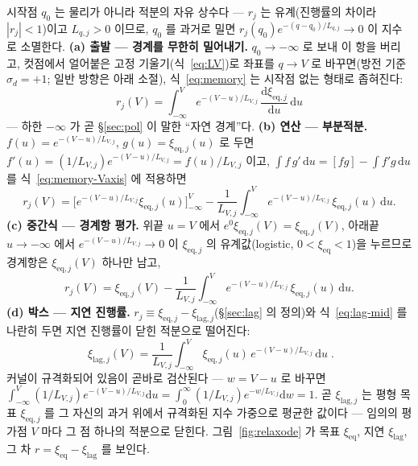 \documentclass[11pt,a4paper]{article}
\newcommand{\dd}{\mathrm{d}}
\newcommand{\eq}{\mathrm{eq}}
\begin{document}
시작점 $q_0$ 는 물리가 아니라 적분의 자유 상수다 --- $r_j$ 는 유계(진행률의 차이라 $|r_j|<1$)이고
$L_{q,j}>0$ 이므로, $q_0$ 를 과거로 밀면 $r_j(q_0)e^{-(q-q_0)/L_{q,j}}\to0$ 이 지수로 소멸한다.
\textbf{(a) 출발 --- 경계를 무한히 밀어내기.} $q_0\to-\infty$ 로 보내 이 항을 버리고, 컷점에서 얼어붙은
고정 기울기(식~\eqref{eq:LV})로 좌표를 $q\to V$ 로 바꾸면(방전 기준 $\sigma_d=+1$; 일반 방향은
아래 소절), 식~\eqref{eq:memory} 는 시작점 없는 형태로 좁혀진다:
\begin{equation}
r_j(V)=\int_{-\infty}^{V} e^{-(V-u)/L_{V,j}}\,\frac{\dd\xi_{\eq,j}}{\dd u}\,\dd u
\label{eq:memory-Vaxis}
\end{equation}
--- 하한 $-\infty$ 가 곧 \S\ref{sec:pol} 이 말한 ``자연 경계''다. \textbf{(b) 연산 --- 부분적분.}
$f(u)=e^{-(V-u)/L_{V,j}}$, $g(u)=\xi_{\eq,j}(u)$ 로 두면 $f'(u)=(1/L_{V,j})e^{-(V-u)/L_{V,j}}=f(u)/L_{V,j}$
이고, $\int f\,g'\,\dd u=[fg]-\int f'g\,\dd u$ 를 식~\eqref{eq:memory-Vaxis} 에 적용하면
\begin{equation}
r_j(V)=\Big[e^{-(V-u)/L_{V,j}}\xi_{\eq,j}(u)\Big]_{-\infty}^{V}
-\frac{1}{L_{V,j}}\int_{-\infty}^{V} e^{-(V-u)/L_{V,j}}\,\xi_{\eq,j}(u)\,\dd u.
\label{eq:lag-byparts}
\end{equation}
\textbf{(c) 중간식 --- 경계항 평가.} 위끝 $u=V$ 에서 $e^{0}\xi_{\eq,j}(V)=\xi_{\eq,j}(V)$, 아래끝
$u\to-\infty$ 에서 $e^{-(V-u)/L_{V,j}}\to0$ 이 $\xi_{\eq,j}$ 의 유계값(logistic, $0<\xi_\eq<1$)을
누르므로 경계항은 $\xi_{\eq,j}(V)$ 하나만 남고,
\begin{equation}
r_j(V)=\xi_{\eq,j}(V)-\frac{1}{L_{V,j}}\int_{-\infty}^{V} e^{-(V-u)/L_{V,j}}\,\xi_{\eq,j}(u)\,\dd u.
\label{eq:lag-mid}
\end{equation}
\textbf{(d) 박스 --- 지연 진행률.} $r_j\equiv\xi_{\eq,j}-\xi_{\mathrm{lag},j}$(\S\ref{sec:lag} 의 정의)와
식~\eqref{eq:lag-mid} 를 나란히 두면 지연 진행률이 닫힌 적분으로 떨어진다:
\begin{equation}
\boxed{\;\xi_{\mathrm{lag},j}(V)=\frac{1}{L_{V,j}}\int_{-\infty}^{V} \xi_{\eq,j}(u)\,e^{-(V-u)/L_{V,j}}\,\dd u\;.}
\label{eq:lag}
\end{equation}
커널이 규격화되어 있음이 곧바로 검산된다 --- $w=V-u$ 로 바꾸면
$\int_{-\infty}^{V}(1/L_{V,j})e^{-(V-u)/L_{V,j}}\dd u=\int_0^\infty (1/L_{V,j})e^{-w/L_{V,j}}\dd w=1$.
곧 $\xi_{\mathrm{lag},j}$ 는 평형 목표 $\xi_{\eq,j}$ 를 그 자신의 과거 위에서 규격화된 지수 가중으로
평균한 값이다 --- 임의의 평가점 $V$ 마다 그 점 하나의 적분으로 닫힌다.
그림~\ref{fig:relaxode} 가 목표 $\xi_\eq$, 지연 $\xi_\mathrm{lag}$, 그 차 $r=\xi_\eq-\xi_\mathrm{lag}$ 를
보인다.
\end{document}
